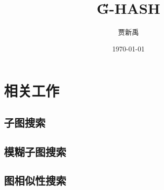 \documentclass[12pt]{article}
\title{\H G-HASH}
\author{贾新禹}
\date{\E\today}
\begin{document}
\maketitle
\section{相关工作}
\subsection{子图搜索}
\subsection{模糊子图搜索}
\subsection{图相似性搜索}
\end{document}
